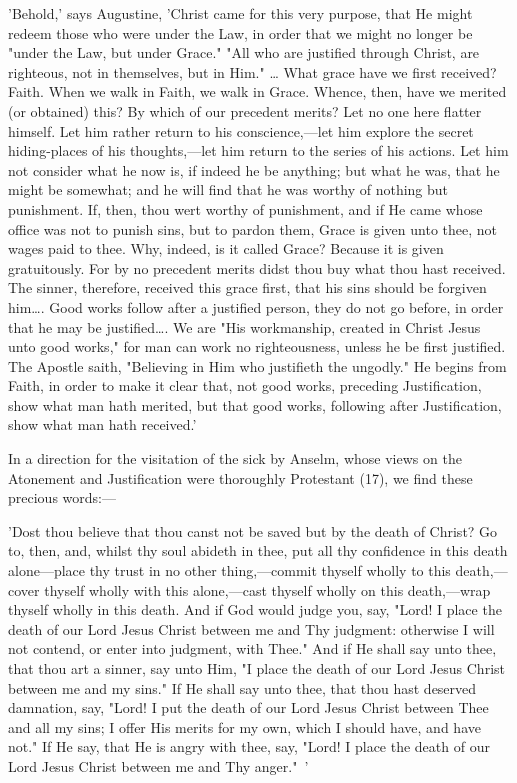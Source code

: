 \documentclass[
]{book}
\begin{document}
'Behold,' says Augustine, 'Christ came for this very purpose, that He might redeem those who were under the Law, in order that we might no longer be "under the Law, but under Grace." "All who are justified through Christ, are righteous, not in themselves, but in Him." \ldots{} What grace have we first received? Faith. When we walk in Faith, we walk in Grace. Whence, then, have we merited (or obtained) this? By which of our precedent merits? Let no one here flatter himself. Let him rather return to his conscience,---let him explore the secret hiding-places of his thoughts,---let him return to the series of his actions. Let him not consider what he now is, if indeed he be anything; but what he was, that he might be somewhat; and he will find that he was worthy of nothing but punishment. If, then, thou wert worthy of punishment, and if He came whose office was not to punish sins, but to pardon them, Grace is given unto thee, not wages paid to thee. Why, indeed, is it called Grace? Because it is given gratuitously. For by no precedent merits didst thou buy what thou hast received. The sinner, therefore, received this grace first, that his sins should be forgiven him\ldots. Good works follow after a justified person, they do not go before, in order that he may be justified\ldots. We are "His workmanship, created in Christ Jesus unto good works," for man can work no righteousness, unless he be first justified. The Apostle saith, "Believing in Him who justifieth the ungodly." He begins from Faith, in order to make it clear that, not good works, preceding Justification, show what man hath merited, but that good works, following after Justification, show what man hath received.'

In a direction for the visitation of the sick by Anselm, whose views on the Atonement and Justification were thoroughly Protestant (17), we find these precious words:---

'Dost thou believe that thou canst not be saved but by the death of Christ? Go to, then, and, whilst thy soul abideth in thee, put all thy confidence in this death alone---place thy trust in no other thing,---commit thyself wholly to this death,---cover thyself wholly with this alone,---cast thyself wholly on this death,---wrap thyself wholly in this death. And if God would judge you, say, "Lord! I place the death of our Lord Jesus Christ between me and Thy judgment: otherwise I will not contend, or enter into judgment, with Thee." And if He shall say unto thee, that thou art a sinner, say unto Him, "I place the death of our Lord Jesus Christ between me and my sins." If He shall say unto thee, that thou hast deserved damnation, say, "Lord! I put the death of our Lord Jesus Christ between Thee and all my sins; I offer His merits for my own, which I should have, and have not." If He say, that He is angry with thee, say, "Lord! I place the death of our Lord Jesus Christ between me and Thy anger."~'
\end{document}

